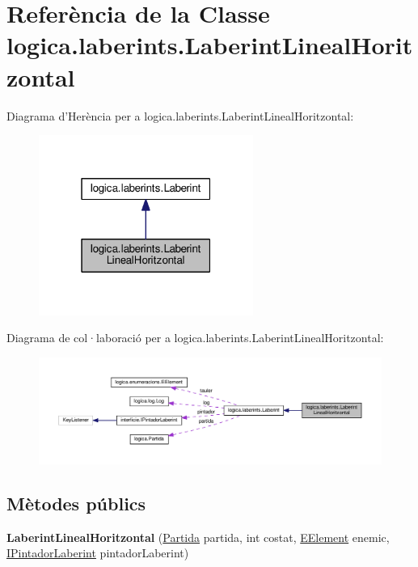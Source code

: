 \hypertarget{classlogica_1_1laberints_1_1_laberint_lineal_horitzontal}{\section{Referència de la Classe logica.\+laberints.\+Laberint\+Lineal\+Horitzontal}
\label{classlogica_1_1laberints_1_1_laberint_lineal_horitzontal}
}


Diagrama d'Herència per a logica.\+laberints.\+Laberint\+Lineal\+Horitzontal\+:\nopagebreak
\begin{figure}[H]
\begin{center}
\leavevmode
\includegraphics[width=199pt]{classlogica_1_1laberints_1_1_laberint_lineal_horitzontal__inherit__graph}
\end{center}
\end{figure}


Diagrama de col·laboració per a logica.\+laberints.\+Laberint\+Lineal\+Horitzontal\+:\nopagebreak
\begin{figure}[H]
\begin{center}
\leavevmode
\includegraphics[width=350pt]{classlogica_1_1laberints_1_1_laberint_lineal_horitzontal__coll__graph}
\end{center}
\end{figure}
\subsection*{Mètodes públics}
\begin{DoxyCompactItemize}
\item 
\hypertarget{classlogica_1_1laberints_1_1_laberint_lineal_horitzontal_a3aa38bdd438bdc9db196ae507944e34a}{{\bfseries Laberint\+Lineal\+Horitzontal} (\hyperlink{classlogica_1_1_partida}{Partida} partida, int costat, \hyperlink{enumlogica_1_1enumeracions_1_1_e_element}{E\+Element} enemic, \hyperlink{interfaceinterficie_1_1_i_pintador_laberint}{I\+Pintador\+Laberint} pintador\+Laberint)}\label{classlogica_1_1laberints_1_1_laberint_lineal_horitzontal_a3aa38bdd438bdc9db196ae507944e34a}

\end{DoxyCompactItemize}
